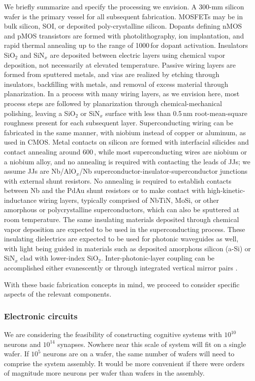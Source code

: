 \documentclass[twocolumn]{article}
\begin{document}
We briefly summarize and specify the processing we envision. A 300-mm silicon wafer is the primary vessel for all subsequent fabrication. MOSFETs may be in bulk silicon, SOI, or deposited poly-crystalline silicon. Dopants defining nMOS and pMOS transistors are formed with photolithography, ion implantation, and rapid thermal annealing up to the range of 1000\,\textcelsius for dopant activation. Insulators SiO$_2$ and SiN$_x$ are deposited between electric layers using chemical vapor deposition, not necessarily at elevated temperature. Passive wiring layers are formed from sputtered metals, and vias are realized by etching through insulators, backfilling with metals, and removal of excess material through planarization. In a process with many wiring layers, as we envision here, most process steps are followed by planarization through chemical-mechanical polishing, leaving a SiO$_2$ or SiN$_x$ surface with less than 0.5\,nm root-mean-square roughness present for each subsequent layer. Superconducting wiring can be fabricated in the same manner, with niobium instead of copper or aluminum, as used in CMOS. Metal contacts on silicon are formed with interfacial silicides and contact annealing around 600\,\textcelsius, while most superconducting wires are niobium or a niobium alloy, and no annealing is required with contacting the leads of JJs; we assume JJs are Nb/AlO$_x$/Nb superconductor-insulator-superconductor junctions with external shunt resistors. No annealing is required to establish contacts between Nb and the PdAu shunt resistors or to make contact with high-kinetic-inductance wiring layers, typically comprised of NbTiN, MoSi, or other amorphous or polycrystalline superconductors, which can also be sputtered at room temperature. The same insulating materials deposited through chemical vapor deposition are expected to be used in the superconducting process. These insulating dielectrics are expected to be used for photonic waveguides as well, with light being guided in materials such as deposited amorphous silicon (a-Si) or SiN$_x$ clad with lower-index SiO$_2$. Inter-photonic-layer coupling can be accomplished either evanescently \cite{} or through integrated vertical mirror pairs \cite{}.

With these basic fabrication concepts in mind, we proceed to consider specific aspects of the relevant components. 

\subsubsection{Electronic circuits}
We are considering the feasibility of constructing cognitive systems with $10^{10}$ neurons and $10^{14}$ synapses. Nowhere near this scale of system will fit on a single wafer. If $10^5$ neurons are on a wafer, the same number of wafers will need to comprise the system assembly. It would be more convenient if there were orders of magnitude more neurons per wafer than wafers in the assembly.
\end{document}
